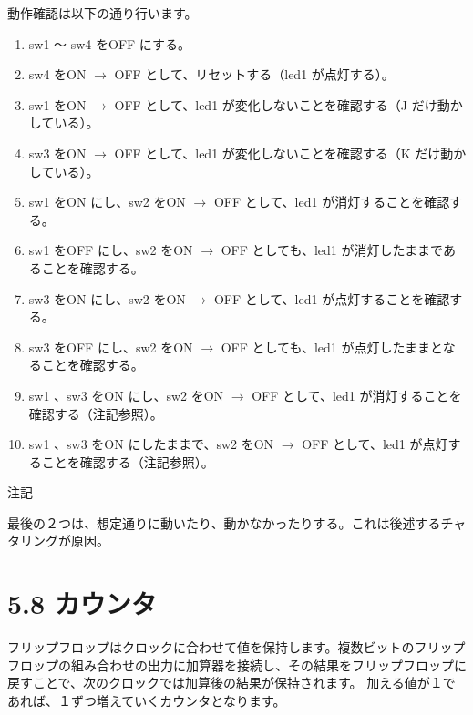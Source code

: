 \documentclass[letterpaper,10pt,dvipdfmx]{sphinxmanual}
\begin{document}
動作確認は以下の通り行います。
\begin{enumerate}
\item {} 
sw1 ～ sw4 をOFF にする。

\item {} 
sw4 をON \(\rightarrow\) OFF として、リセットする（led1 が点灯する）。

\item {} 
sw1 をON \(\rightarrow\) OFF として、led1 が変化しないことを確認する（J だけ動かしている）。

\item {} 
sw3 をON \(\rightarrow\) OFF として、led1 が変化しないことを確認する（K だけ動かしている）。

\item {} 
sw1 をON にし、sw2 をON \(\rightarrow\) OFF として、led1 が消灯することを確認する。

\item {} 
sw1 をOFF にし、sw2 をON \(\rightarrow\) OFF としても、led1 が消灯したままであることを確認する。

\item {} 
sw3 をON にし、sw2 をON \(\rightarrow\) OFF として、led1 が点灯することを確認する。

\item {} 
sw3 をOFF にし、sw2 をON \(\rightarrow\) OFF としても、led1 が点灯したままとなることを確認する。

\item {} 
sw1 、sw3 をON にし、sw2 をON \(\rightarrow\) OFF として、led1 が消灯することを確認する（注記参照）。

\item {} 
sw1 、sw3 をON にしたままで、sw2 をON \(\rightarrow\) OFF として、led1 が点灯することを確認する（注記参照）。

\end{enumerate}

注記

最後の２つは、想定通りに動いたり、動かなかったりする。これは後述するチャタリングが原因。


\section{5.8 カウンタ}
\label{05_try:id14}
フリップフロップはクロックに合わせて値を保持します。複数ビットのフリップフロップの組み合わせの出力に加算器を接続し、その結果をフリップフロップに戻すことで、次のクロックでは加算後の結果が保持されます。
加える値が１であれば、１ずつ増えていくカウンタとなります。
\end{document}
